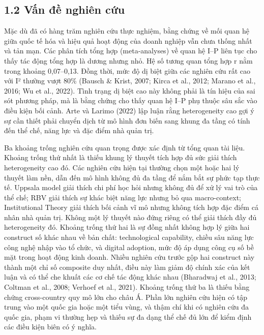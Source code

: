\documentclass[12pt,a4paper]{article}
\begin{document}
\hypertarget{12-vux1ea5n-ux111ux1ec1-nghiuxean-cux1ee9u}{%
\subsection{1.2 Vấn đề nghiên
cứu}\label{12-vux1ea5n-ux111ux1ec1-nghiuxean-cux1ee9u}}

Mặc dù đã có hàng trăm nghiên cứu thực nghiệm, bằng chứng về mối quan hệ
giữa quốc tế hóa và hiệu quả hoạt động của doanh nghiệp vẫn chưa thống
nhất và tản mạn. Các phân tích tổng hợp (meta-analyses) về quan hệ I--P
liên tục cho thấy tác động tổng hợp là dương nhưng nhỏ. Hệ số tương quan
tổng hợp r nằm trong khoảng 0,07--0,13. Đồng thời, mức độ dị biệt giữa
các nghiên cứu rất cao với I² thường vượt 80\% (Bausch \& Krist, 2007;
Kirca et al., 2012; Marano et al., 2016; Wu et al., 2022). Tình trạng dị
biệt cao này không phải là tín hiệu của sai sót phương pháp, mà là bằng
chứng cho thấy quan hệ I--P phụ thuộc sâu sắc vào điều kiện bối cảnh.
Arte và Larimo (2022) lập luận rằng heterogeneity cao gợi ý sự cần thiết
phải chuyển dịch từ mô hình đơn biến sang khung đa tầng có tính đến thể
chế, năng lực và đặc điểm nhà quản trị.

Ba khoảng trống nghiên cứu quan trọng được xác định từ tổng quan tài
liệu. Khoảng trống thứ nhất là thiếu khung lý thuyết tích hợp đủ sức
giải thích heterogeneity cao đó. Các nghiên cứu hiện tại thường chọn một
hoặc hai lý thuyết làm nền, dẫn đến mô hình không đủ đa tầng để nắm bắt
sự phức tạp thực tế. Uppsala model giải thích chi phí học hỏi nhưng
không đủ để xử lý vai trò của thể chế; RBV giải thích sự khác biệt năng
lực nhưng bỏ qua macro-context; Institutional Theory giải thích bối cảnh
vĩ mô nhưng không tích hợp đặc điểm cá nhân nhà quản trị. Không một lý
thuyết nào đứng riêng có thể giải thích đầy đủ heterogeneity đó. Khoảng
trống thứ hai là sự đồng nhất không hợp lý giữa hai construct số khác
nhau về bản chất: technological capability, chiều sâu năng lực công nghệ
nhập vào tổ chức, và digital adoption, mức độ áp dụng công cụ số bề mặt
trong hoạt động kinh doanh. Nhiều nghiên cứu trước gộp hai construct này
thành một chỉ số composite duy nhất, điều này làm giảm độ chính xác của
kết luận và có thể che khuất các cơ chế tác động khác nhau (Bharadwaj et
al., 2013; Coltman et al., 2008; Verhoef et al., 2021). Khoảng trống thứ
ba là thiếu bằng chứng cross-country quy mô lớn cho châu Á. Phần lớn
nghiên cứu hiện có tập trung vào một quốc gia hoặc một tiểu vùng, và
thậm chí khi có nghiên cứu đa quốc gia, phạm vi thường hẹp và thiếu sự
đa dạng thể chế đủ lớn để kiểm định các điều kiện biên có ý nghĩa.
\end{document}
